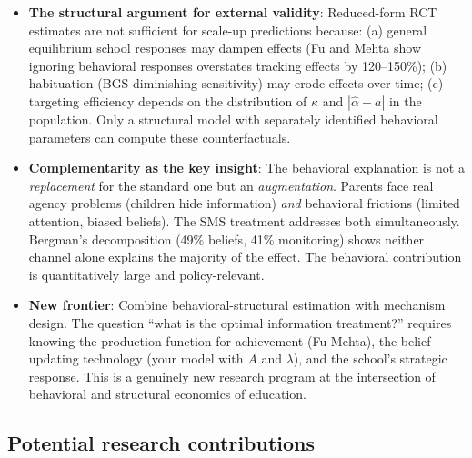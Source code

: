 \documentclass[11pt]{article}
\begin{document}
\begin{itemize}
  \item \textbf{The structural argument for external validity}: Reduced-form RCT estimates are not sufficient for scale-up predictions because: (a) general equilibrium school responses may dampen effects (Fu and Mehta show ignoring behavioral responses overstates tracking effects by 120--150\%); (b) habituation (BGS diminishing sensitivity) may erode effects over time; (c) targeting efficiency depends on the distribution of $\kappa$ and $|\hat{\alpha} - a|$ in the population. Only a structural model with separately identified behavioral parameters can compute these counterfactuals.
  \item \textbf{Complementarity as the key insight}: The behavioral explanation is not a \emph{replacement} for the standard one but an \emph{augmentation}. Parents face real agency problems (children hide information) \emph{and} behavioral frictions (limited attention, biased beliefs). The SMS treatment addresses both simultaneously. Bergman's decomposition (49\% beliefs, 41\% monitoring) shows neither channel alone explains the majority of the effect. The behavioral contribution is quantitatively large and policy-relevant.
  \item \textbf{New frontier}: Combine behavioral-structural estimation with mechanism design. The question ``what is the optimal information treatment?'' requires knowing the production function for achievement (Fu-Mehta), the belief-updating technology (your model with $A$ and $\lambda$), and the school's strategic response. This is a genuinely new research program at the intersection of behavioral and structural economics of education.
\end{itemize}

\subsection{Potential research contributions}
\end{document}
